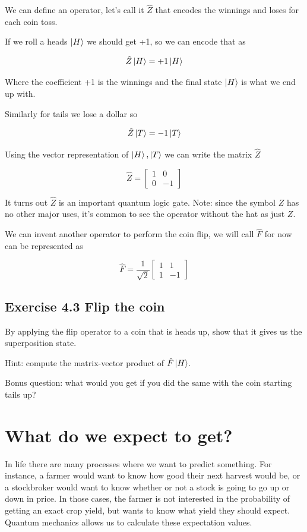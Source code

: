 \documentclass{book}
\begin{document}
We can define an operator, let's call it $\hat{Z}$ that encodes the winnings and loses for each coin toss. 

If we roll a heads $\ket{H}$ we should get +1, so we can encode that as 

$$
\hat{Z}\ket{H} = +1 \ket{H}
$$

Where the coefficient +1 is the winnings and the final state $\ket{H}$ is what we end up with. 

Similarly for tails we lose a dollar so 

$$
\hat{Z}\ket{T} = -1 \ket{T}
$$

Using the vector representation of $\ket{H}, \ket{T}$ we can write the matrix $\hat{Z}$

$$ \hat{Z} = \begin{bmatrix} 1 & 0 \\ 0 & -1 \end{bmatrix} $$

It turns out $\hat{Z}$ is an important quantum logic gate. Note: since the symbol $Z$ has no other major uses, it's common to see the operator without the hat as just $Z$.


We can invent another operator to perform the coin flip, we will call $\hat{F}$ for now can be represented as 

$$
\hat{F} =  \frac{1}{\sqrt{2}} \begin{bmatrix} 1 & 1 \\ 1 & -1 \end{bmatrix}
$$


\subsection{Exercise 4.3 Flip the coin}   

By applying the flip operator to a coin that is heads up, show that it gives us the superposition state.  

Hint: compute the matrix-vector product of $\hat{F}\ket{H}$.   
  
Bonus question: what would you get if you did the same with the coin starting tails up?  



\section{What do we expect to get?}

In life there are many processes where we want to predict something. For instance, a farmer would want to know how good their next harvest would be, or a stockbroker would want to know whether or not a stock is going to go up or down in price. In those cases, the farmer is not interested in the probability of getting an exact crop yield, but wants to know what yield they should expect. Quantum mechanics allows us to calculate these expectation values.
\end{document}
